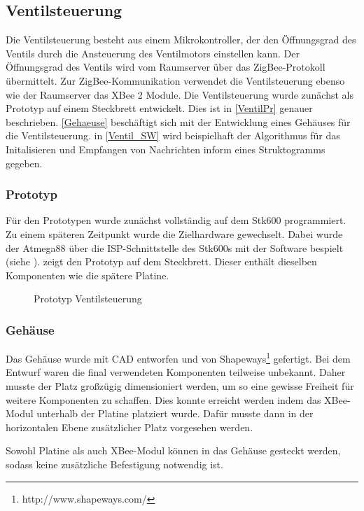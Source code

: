 \subsection{Ventilsteuerung}\label{Ventil}
Die Ventilsteuerung besteht aus einem Mikrokontroller, der den Öffnungsgrad des Ventils durch die Ansteuerung des Ventilmotors einstellen kann. Der Öffnungsgrad des Ventils wird vom Raumserver über das ZigBee-Protokoll übermittelt. Zur ZigBee-Kommunikation verwendet die Ventilsteuerung ebenso wie der Raumserver das XBee 2 Module. Die Ventilsteuerung wurde zunächst als Prototyp auf einem Steckbrett entwickelt. Dies ist in \autoref{VentilPr} genauer beschrieben. \autoref{Gehaeuse} beschäftigt sich mit der Entwicklung eines Gehäuses für die Ventilsteuerung. in \autoref{Ventil_SW} wird beispielhaft der Algorithmus für das Initalisieren und Empfangen von Nachrichten inform eines Struktogramms gegeben.

\subsubsection{Prototyp}\label{VentilPr}
Für den Prototypen wurde zunächst vollständig auf dem Stk600 programmiert. Zu einem späteren Zeitpunkt wurde die Zielhardware gewechselt. Dabei wurde der Atmega88 über die \ac{ISP-Schnittstelle} des Stk600s mit der Software bespielt (siehe ).  zeigt den Prototyp auf dem Steckbrett. Dieser enthält dieselben Komponenten wie die spätere Platine.
\begin{figure}[H]
\centering
{}
\caption{Prototyp Ventilsteuerung}
\label{fig:PrV}
\end{figure}

\subsubsection{Gehäuse}\label{Gehaeuse}
Das Gehäuse wurde mit CAD entworfen und von Shapeways\footnote{http://www.shapeways.com/} gefertigt. Bei dem Entwurf waren die final verwendeten Komponenten teilweise unbekannt. Daher musste der Platz großzügig dimensioniert werden, um so eine gewisse Freiheit für weitere Komponenten zu schaffen. Dies konnte erreicht werden indem das XBee-Modul unterhalb der Platine platziert wurde. Dafür musste dann in der horizontalen Ebene zusätzlicher Platz vorgesehen werden.

Sowohl Platine als auch XBee-Modul können in das Gehäuse gesteckt werden, sodass keine zusätzliche Befestigung notwendig ist.


